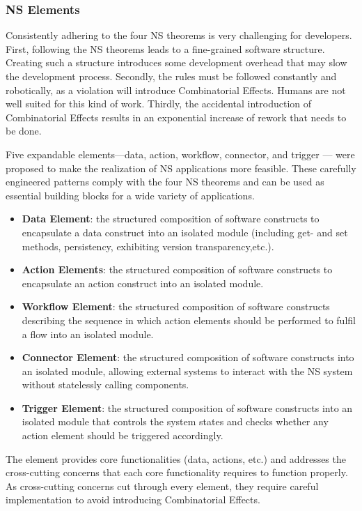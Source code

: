 \subsubsection{NS Elements}\label{NS Elements} Consistently adhering to the four NS
theorems is very challenging for developers. First, following the NS theorems leads to a
fine-grained software structure. Creating such a structure introduces some development
overhead that may slow the development process. Secondly, the rules must be followed
constantly and robotically, as a violation will introduce Combinatorial Effects. Humans
are not well suited for this kind of work. Thirdly, the accidental introduction of
Combinatorial Effects results in an exponential increase of rework that needs to be done.

Five expandable elements—data, action, workflow, connector, and trigger — were proposed to
make the realization of NS applications more feasible. These carefully engineered patterns
comply with the four NS theorems and can be used as essential building blocks for a wide
variety of applications.

\begin{itemize}
    \item \textbf{Data Element}: the structured composition of software constructs to encapsulate a data construct into an isolated module (including get- and set methods, persistency, exhibiting version transparency,etc.).
    \item \textbf{Action Elements}: the structured composition of software constructs to encapsulate an action construct into an isolated module.
    \item \textbf{Workflow Element}: the structured composition of software constructs describing the sequence in which action elements should be performed to fulfil a flow into an isolated module.
    \item \textbf{Connector Element}: the structured composition of software constructs into an isolated module, allowing external systems to interact with the NS system without statelessly calling components.
    \item \textbf{Trigger Element}: the structured composition of software constructs into an isolated module that controls the system states and checks whether any action element should be triggered accordingly.
\end{itemize}

The element provides core functionalities (data, actions, etc.) and addresses the
cross-cutting concerns that each core functionality requires to function properly. As
cross-cutting concerns cut through every element, they require careful implementation to
avoid introducing Combinatorial Effects.
%
%
